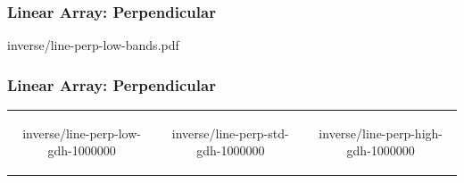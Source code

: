 % 

\begin{frame}\frametitle{Linear Array: Perpendicular}
\center
	\begin{overpic}[ scale = 0.55 ]
		{\pLocalGraphics inverse/line-perp-low-bands.pdf}
	\end{overpic}
\end{frame}
%
\begin{frame}\frametitle{Linear Array: Perpendicular}
\begin{table}[htp]
\begin{center}
	\begin{tabular}{ccc}
		\begin{overpic}[ scale = 0.325 ] {\pLocalGraphics inverse/line-perp-low-gdh-1000000} \end{overpic} &
		\begin{overpic}[ scale = 0.325 ] {\pLocalGraphics inverse/line-perp-std-gdh-1000000} \end{overpic} &
		\begin{overpic}[ scale = 0.325 ] {\pLocalGraphics inverse/line-perp-high-gdh-1000000} \end{overpic} 
	\end{tabular}
\end{center}
\end{table}%
\end{frame}


\endinput  %
